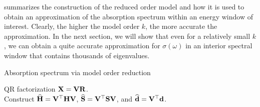  summarizes the construction of the reduced order model and how it is used to obtain an approximation of the absorption spectrum within an energy window of interest. Clearly, the higher the model order $k$, the more accurate the approximation. In the next section, we will show that even for a relatively small $k$, we can obtain a quite accurate approximation for $\sigma(\omega)$ in an interior spectral window that contains thousands of eigenvalues. 

\begin{algorithm2e}[hbtp]
\caption{Absorption spectrum via model order reduction}%
\label{alg:mor}%
\BlankLine

\BlankLine
{}
\BlankLine
\BlankLine
{}
\nl QR factorization $\mathbf{X} = \mathbf{V}\mathbf{R}$.\\
\nl Construct $\widehat{\mathbf{H}} = \mathbf{V}^\top \mathbf{H} \mathbf{V}$, $\widehat{\mathbf{S}} = \mathbf{V}^\top \mathbf{S} \mathbf{V}$, and $\widehat{\mathbf{d}} = \mathbf{V}^\top \mathbf{d}$. \\
\BlankLine
{}
\end{algorithm2e}

